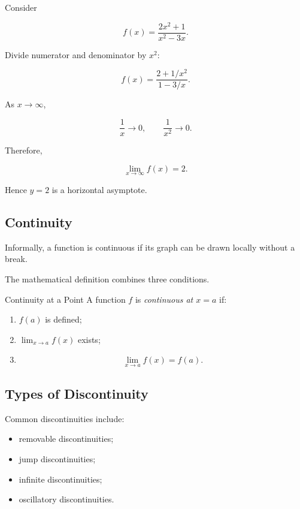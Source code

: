 Consider

\[ f(x)=\frac{2x^2+1}{x^2-3x}. \]

Divide numerator and denominator by \(x^2\):

\[ f(x)=\frac{2+1/x^2}{1-3/x}. \]

As \(x\to\infty\),

\[ \frac1x\to0,\qquad \frac1{x^2}\to0. \]

Therefore,

\[ \boxed{\lim_{x\to\infty}f(x)=2.} \]

Hence \(y=2\) is a horizontal asymptote.

\subsection{Continuity}
\label{subsec:continuity}

Informally, a function is continuous if its graph can be drawn locally
without a break.

The mathematical definition combines three conditions.

\begin{definitionbox}{Continuity at a Point}
A function \(f\) is \emph{continuous at \(x=a\)} if:
\begin{enumerate}
    \item \(f(a)\) is defined;
    \item \(\lim_{x\to a}f(x)\) exists;
    \item
    \[ \lim_{x\to a}f(x)=f(a). \]
\end{enumerate}
\end{definitionbox}

\subsection{Types of Discontinuity}
\label{subsec:types-discontinuity}

Common discontinuities include:

\begin{itemize}
    \item removable discontinuities;
    \item jump discontinuities;
    \item infinite discontinuities;
    \item oscillatory discontinuities.
\end{itemize}

